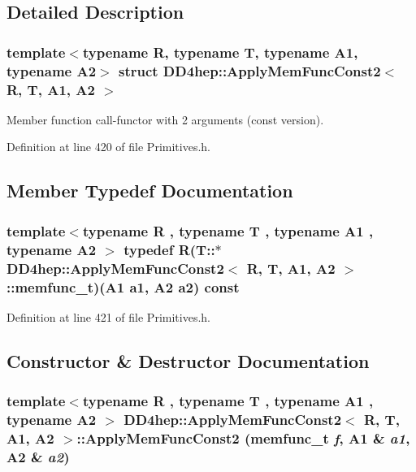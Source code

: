 \subsection{Detailed Description}
\subsubsection*{template$<$typename R, typename T, typename A1, typename A2$>$ struct DD4hep::ApplyMemFuncConst2$<$ R, T, A1, A2 $>$}

Member function call-\/functor with 2 arguments (const version). 

Definition at line 420 of file Primitives.h.

\subsection{Member Typedef Documentation}
\hypertarget{struct_d_d4hep_1_1_apply_mem_func_const2_acd005c15f4d84a4c7b322c1a8a2a8dc9}{
\subsubsection[{memfunc\_\-t}]{\setlength{\rightskip}{0pt plus 5cm}template$<$typename R , typename T , typename A1 , typename A2 $>$ typedef R(T::$\ast$ {\bf DD4hep::ApplyMemFuncConst2}$<$ R, {\bf T}, A1, A2 $>$::{\bf memfunc\_\-t})(A1 a1, A2 a2) const }}
\label{struct_d_d4hep_1_1_apply_mem_func_const2_acd005c15f4d84a4c7b322c1a8a2a8dc9}


Definition at line 421 of file Primitives.h.

\subsection{Constructor \& Destructor Documentation}
\hypertarget{struct_d_d4hep_1_1_apply_mem_func_const2_a41c881b9faf4f7f0fe9c82e3a39c4ca0}{
\subsubsection[{ApplyMemFuncConst2}]{\setlength{\rightskip}{0pt plus 5cm}template$<$typename R , typename T , typename A1 , typename A2 $>$ {\bf DD4hep::ApplyMemFuncConst2}$<$ R, {\bf T}, A1, A2 $>$::{\bf ApplyMemFuncConst2} ({\bf memfunc\_\-t} {\em f}, \/  A1 \& {\em a1}, \/  A2 \& {\em a2})}}
\label{struct_d_d4hep_1_1_apply_mem_func_const2_a41c881b9faf4f7f0fe9c82e3a39c4ca0}


